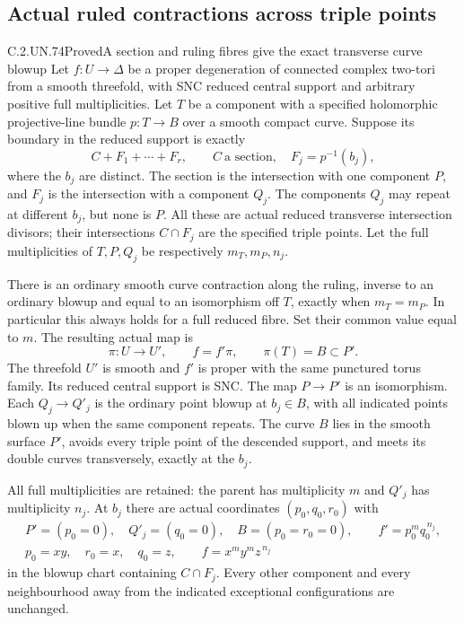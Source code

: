 \subsection{Actual ruled contractions across triple points}

\begin{statement}{C.2.UN.74}{Proved}{A section and ruling fibres give the exact transverse curve blowup}
Let $f:U\to\Delta$ be a proper degeneration of connected
complex two-tori from a smooth threefold, with SNC reduced
central support and arbitrary positive full multiplicities.
Let $T$ be a component with a specified holomorphic
projective-line bundle $p:T\to B$ over a smooth compact
curve. Suppose its boundary in the reduced support is
exactly
\[
           C+F_1+\cdots+F_r,\qquad
           C\ \text{a section},\quad F_j=p^{-1}(b_j),
\tag{C.RC.1}
\]
where the $b_j$ are distinct. The section is the
intersection with one component $P$, and $F_j$ is the
intersection with a component $Q_j$. The components
$Q_j$ may repeat at different $b_j$, but none is $P$.
All these are actual reduced transverse intersection
divisors; their intersections $C\cap F_j$ are the
specified triple points. Let the full multiplicities
of $T,P,Q_j$ be respectively $m_T,m_P,n_j$.

There is an ordinary smooth curve contraction along
the ruling, inverse to an ordinary blowup and equal
to an isomorphism off $T$, exactly when
$m_T=m_P$. In particular this always holds for a
full reduced fibre. Set their common value equal
to $m$. The resulting actual map is
\[
              \pi:U\longrightarrow U',\qquad
              f=f'\pi,\qquad \pi(T)=B\subset P'.
\tag{C.RC.2}
\]
The threefold $U'$ is smooth and $f'$ is proper with
the same punctured torus family. Its reduced central
support is SNC. The map $P\to P'$ is an isomorphism.
Each $Q_j\to Q'_j$ is the ordinary point blowup at
$b_j\in B$, with all indicated points blown up when
the same component repeats. The curve $B$ lies in
the smooth surface $P'$, avoids every triple point
of the descended support, and meets its double
curves transversely, exactly at the $b_j$.

All full multiplicities are retained: the parent
has multiplicity $m$ and $Q'_j$ has multiplicity
$n_j$. At $b_j$ there are actual coordinates
$(p_0,q_0,r_0)$ with
\[
 \begin{gathered}
 P'=(p_0=0),\quad Q'_j=(q_0=0),\quad
 B=(p_0=r_0=0),\qquad f'=p_0^m q_0^{\,n_j},\\
 p_0=xy,\quad r_0=x,\quad q_0=z,\qquad
                         f=x^m y^m z^{\,n_j}
 \end{gathered}
\tag{C.RC.3}
\]
in the blowup chart containing $C\cap F_j$.
Every other component and every neighbourhood away
from the indicated exceptional configurations are
unchanged.


\end{statement}
